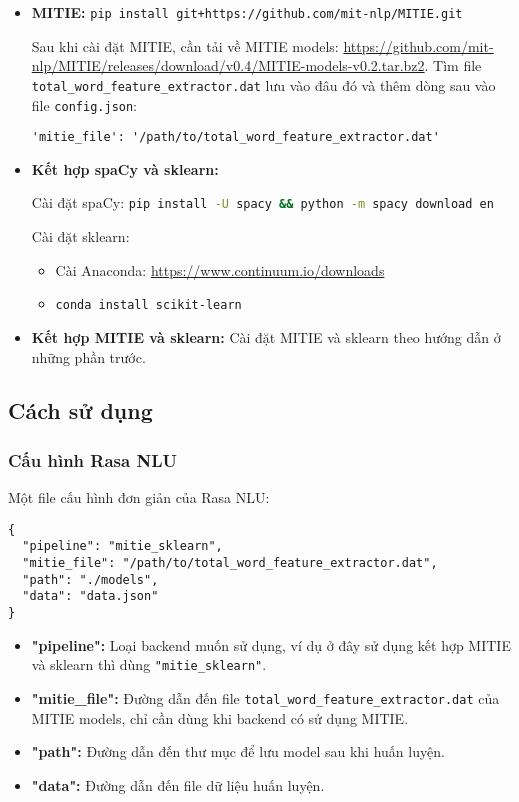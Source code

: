\begin{itemize}
    \item \textbf{MITIE:} \lstinline[language=bash]{pip install git+https://github.com/mit-nlp/MITIE.git}
    
    Sau khi cài đặt MITIE, cần tải về MITIE models: \url{https://github.com/mit-nlp/MITIE/releases/download/v0.4/MITIE-models-v0.2.tar.bz2}. Tìm file \lstinline{total_word_feature_extractor.dat} lưu vào đâu đó và thêm dòng sau vào file \lstinline{config.json}:
    
    \lstinline{'mitie_file': '/path/to/total_word_feature_extractor.dat'}
    
    \item \textbf{Kết hợp spaCy và sklearn:}
    
    Cài đặt spaCy: \lstinline[language=bash]{pip install -U spacy && python -m spacy download en}
    
    Cài đặt sklearn:
    
    \begin{itemize}
        \item Cài Anaconda: \url{https://www.continuum.io/downloads}
        \item \lstinline[language=bash]{conda install scikit-learn}
    \end{itemize}
    
    \item \textbf{Kết hợp MITIE và sklearn:} Cài đặt MITIE và sklearn theo hướng dẫn ở những phần trước.
\end{itemize}

\subsection{Cách sử dụng}

\subsubsection{Cấu hình Rasa NLU}

Một file cấu hình đơn giản của Rasa NLU:

\begin{lstlisting}[title=config.json]
{
  "pipeline": "mitie_sklearn",
  "mitie_file": "/path/to/total_word_feature_extractor.dat",
  "path": "./models",
  "data": "data.json"
}
\end{lstlisting}

\begin{itemize}
    \item \textbf{"pipeline":} Loại backend muốn sử dụng, ví dụ ở đây sử dụng kết hợp MITIE và sklearn thì dùng \lstinline{"mitie_sklearn"}.
    \item \textbf{"mitie\_file":} Đường dẫn đến file \lstinline{total_word_feature_extractor.dat} của MITIE models, chỉ cần dùng khi backend có sử dụng MITIE.
    \item \textbf{"path":} Đường dẫn đến thư mục để lưu model sau khi huấn luyện.
    \item \textbf{"data":} Đường dẫn đến file dữ liệu huấn luyện.
\end{itemize}

